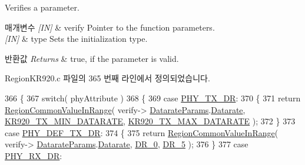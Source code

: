 Verifies a parameter. 


\begin{DoxyParams}{매개변수}
{\em \mbox{[}\+I\+N\mbox{]}} & verify Pointer to the function parameters.\\
\hline
{\em \mbox{[}\+I\+N\mbox{]}} & type Sets the initialization type.\\
\hline
\end{DoxyParams}

\begin{DoxyRetVals}{반환값}
{\em Returns} & true, if the parameter is valid. \\
\hline
\end{DoxyRetVals}


Region\+K\+R920.\+c 파일의 365 번째 라인에서 정의되었습니다.


\begin{DoxyCode}
366 \{
367     \textcolor{keywordflow}{switch}( phyAttribute )
368     \{
369         \textcolor{keywordflow}{case} \mbox{\hyperlink{group___r_e_g_i_o_n_gga51cbe8f5433d914fe9cf81b451de2c2da62c19af9dc2c54540562e1158c015f57}{PHY\_TX\_DR}}:
370         \{
371             \textcolor{keywordflow}{return} \mbox{\hyperlink{group___r_e_g_i_o_n_c_o_m_m_o_n_gafdd1c80d953e18d755a631b72a9c3bd3}{RegionCommonValueInRange}}( verify->
      \mbox{\hyperlink{unionu_verify_params_a92427be16343eb3d9c14334eb95ec058}{DatarateParams}}.\mbox{\hyperlink{structu_verify_params_1_1s_datarate_params_ae2f6080f3aa0e9485c55513ca56bb24d}{Datarate}}, \mbox{\hyperlink{group___r_e_g_i_o_n_k_r920_ga9eff66e6e0242d6a7563dd346a56e3ab}{KR920\_TX\_MIN\_DATARATE}}, 
      \mbox{\hyperlink{group___r_e_g_i_o_n_k_r920_ga58a4171632a233925b8b0153c66a6ff3}{KR920\_TX\_MAX\_DATARATE}} );
372         \}
373         \textcolor{keywordflow}{case} \mbox{\hyperlink{group___r_e_g_i_o_n_gga51cbe8f5433d914fe9cf81b451de2c2da70c3923333165960549162e3dcf10467}{PHY\_DEF\_TX\_DR}}:
374         \{
375             \textcolor{keywordflow}{return} \mbox{\hyperlink{group___r_e_g_i_o_n_c_o_m_m_o_n_gafdd1c80d953e18d755a631b72a9c3bd3}{RegionCommonValueInRange}}( verify->
      \mbox{\hyperlink{unionu_verify_params_a92427be16343eb3d9c14334eb95ec058}{DatarateParams}}.\mbox{\hyperlink{structu_verify_params_1_1s_datarate_params_ae2f6080f3aa0e9485c55513ca56bb24d}{Datarate}}, \mbox{\hyperlink{group___r_e_g_i_o_n_ga6c4ef966b4f3d5eb7597b087f2b97095}{DR\_0}}, \mbox{\hyperlink{group___r_e_g_i_o_n_ga872e12c82020c02a7f70a1c6ed1375df}{DR\_5}} );
376         \}
377         \textcolor{keywordflow}{case} \mbox{\hyperlink{group___r_e_g_i_o_n_gga51cbe8f5433d914fe9cf81b451de2c2da8cc3b895173b07ee71127e366c8d0d55}{PHY\_RX\_DR}}:

\end{DoxyCode}
